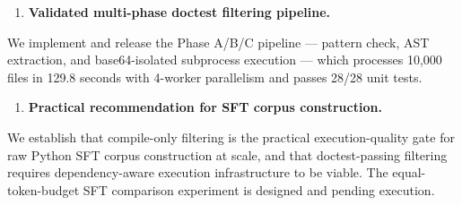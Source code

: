 \begin{enumerate}
\item \textbf{Validated multi-phase doctest filtering pipeline.}
\end{enumerate}
   We implement and release the Phase A/B/C pipeline --- pattern check, AST extraction,
   and base64-isolated subprocess execution --- which processes 10,000 files in 129.8 seconds
   with 4-worker parallelism and passes 28/28 unit tests.

\begin{enumerate}
\item \textbf{Practical recommendation for SFT corpus construction.}
\end{enumerate}
   We establish that compile-only filtering is the practical execution-quality gate for
   raw Python SFT corpus construction at scale, and that doctest-passing filtering requires
   dependency-aware execution infrastructure to be viable. The equal-token-budget SFT
   comparison experiment is designed and pending execution.

